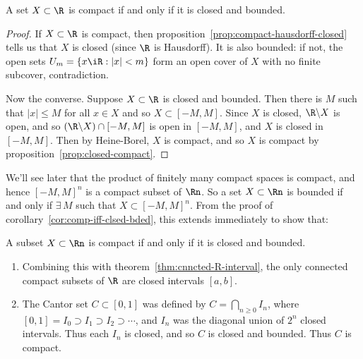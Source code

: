 	\pagebreak

\begin{corollary}
	A set $X\subset\R$ is compact if and only if it is closed and bounded. \label{cor:comp-iff-clsed-bded}
\end{corollary}

\begin{proof}
	If $X\subset\R$ is compact, then proposition~\ref{prop:compact-hausdorff-closed} tells us that $X$ is closed (since $\R$ is Hausdorff). It is also bounded: if not, the open sets $U_m=\left\{x\iR: \left\vert x \right\vert<m\right\}$ form an open cover of $X$ with no finite subcover, contradiction.

	Now the converse. Suppose $X\subset\R$ is closed and bounded. Then there is $M$ such that $\left\vert x \right\vert\leq M$ for all $x\in X$ and so $X\subset[-M,M]$. Since $X$ is closed, $\R\backslash X$ is open, and so $(\R\backslash X)\cap[-M,M]$ is open in $[-M,M]$, and $X$ is closed in $[-M,M]$. Then by Heine-Borel, $X$ is compact, and so $X$ is compact by proposition~\ref{prop:closed-compact}.
\end{proof}

\vspace{3pt}

\begin{remark}
	We'll see later that the product of finitely many compact spaces is compact, and hence $\left[ -M,M \right]^n$ is a compact subset of $\Rn$. So a set $X\subset\Rn$ is bounded if and only if $\exists\,M$ such that $X\subset\left[ -M,M \right]^n$. From the proof of corollary~\ref{cor:comp-iff-clsed-bded}, this extends immediately to show that:
\end{remark}

\begin{corollary}
	A subset $X\subset\Rn$ is compact if and only if it is closed and bounded. \label{cor:compact-clsd-bded}
\end{corollary}

\vspace{-9pt}

\begin{examples}
\mbox{}
\begin{enumerate}
	\shortskip
	\item Combining this with theorem~\ref{thm:cnncted-R-interval}, the only connected compact subsets of $\R$ are closed intervals $[a,b]$.
	\item The Cantor set $C\subset[0,1]$ was defined by $C=\bigcap_{n\geq 0} I_n$, where $[0,1]=I_0\supset I_1\supset I_2\supset \cdots$, and $I_n$ was the diagonal union of $2^n$ closed intervals. Thus each $I_n$ is closed, and so $C$ is closed and bounded. Thus $C$ is compact.
\end{enumerate}
\end{examples}

